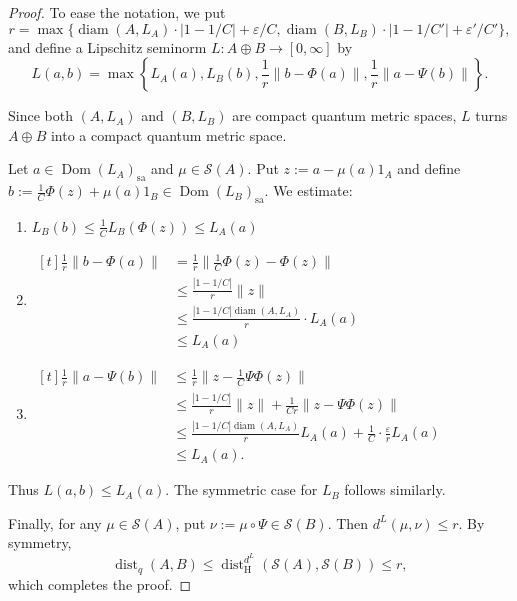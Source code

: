 \documentclass[12pt, reqno]{amsart}
\theoremstyle{definition}
\theoremstyle{remark}
\numberwithin{equation}{section}
\begin{document}
\begin{proof}
To ease the notation, we put
\[
r= \max\bigl\{ \operatorname{diam}(A, L_A) \cdot |1 - 1/C| + \varepsilon/C, \operatorname{diam}(B, L_B) \cdot |1 - 1/C'| + \varepsilon'/C' \bigr\},
\]
and define a Lipschitz seminorm $L: A \oplus B \to [0, \infty]$ by
\[
L(a, b) = \max\left\{ L_A(a), L_B(b), \frac{1}{r}\|b - \Phi(a)\|, \frac{1}{r}\|a - \Psi(b)\| \right\}.
\]

Since both $(A, L_A)$ and $(B, L_B)$ are compact quantum metric spaces, $L$ turns $A \oplus B$ into a compact quantum metric space.

 Let $a \in \operatorname{Dom}(L_A)_{\mathrm{sa}}$ and $\mu \in \mathcal{S}(A)$. Put $z := a - \mu(a)1_A$ and define $b := \frac{1}{C}\Phi(z) + \mu(a)1_B \in \operatorname{Dom}(L_B)_{\mathrm{sa}}$. We estimate:
\begin{enumerate}
    \item $L_B(b) \leqslant \tfrac{1}{C}L_B(\Phi(z)) \leqslant L_A(a)$
    \item $\begin{aligned}[t]
    \tfrac{1}{r}\|b - \Phi(a)\| &= \tfrac{1}{r}\bigl\|\tfrac{1}{C}\Phi(z) - \Phi(z)\bigr\| \\
                               &\leqslant \tfrac{|1-1/C|}{r}\|z\| \\
                               &\leqslant \tfrac{|1-1/C|\operatorname{diam}(A, L_A)}{r} \cdot L_A(a) \\
                               &\leqslant L_A(a)\end{aligned}$
    \item $\begin{aligned}[t]
          \tfrac{1}{r}\|a - \Psi(b)\| &\leqslant \tfrac{1}{r}\bigl\|z - \tfrac{1}{C}\Psi\Phi(z)\bigr\| \\
                               &\leqslant \tfrac{|1-1/C|}{r}\|z\| + \tfrac{1}{Cr}\|z - \Psi\Phi(z)\| \\
                               &\leqslant \tfrac{|1-1/C|\operatorname{diam}(A, L_A)}{r} L_A(a) + \tfrac{1}{C} \cdot \tfrac{\varepsilon}{r} L_A(a)\\ 
                               &\leqslant L_A(a).
          \end{aligned}$
\end{enumerate}
Thus $L(a, b) \leqslant L_A(a)$. The symmetric case for $L_B$ follows similarly.

Finally, for any $\mu \in \mathcal{S}(A)$, put $\nu := \mu \circ \Psi \in  \mathcal{S}(B)$. Then $d^L(\mu, \nu) \leqslant r$. By symmetry,
\[
\operatorname{dist}_{q}(A,B) \leqslant \operatorname{dist}_{\mathrm{H}}^{d^L}( \mathcal{S}(A),  \mathcal{S}(B)) \leqslant r,
\]
which completes the proof.

\end{proof}
\end{document}
